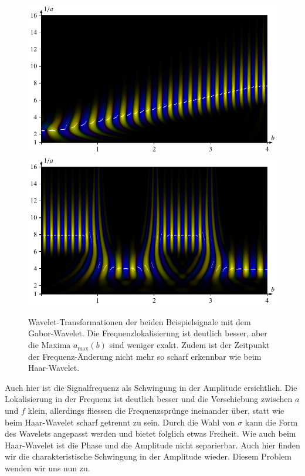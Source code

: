 \begin{figure}
	\centering
	\includegraphics{papers/complex/images/chirp_gabor.pdf}
	\includegraphics{papers/complex/images/square_gabor.pdf}
	\caption{Wavelet-Transformationen der beiden Beispielsignale mit dem Gabor-Wavelet.
		Die Frequenzlokalisierung ist deutlich besser, aber die Maxima $a_\text{max}(b)$ sind weniger exakt. Zudem ist der Zeitpunkt der Frequenz-Änderung nicht mehr so scharf erkennbar wie beim Haar-Wavelet.}
	\label{complex:gabor-ex}
\end{figure}

Auch hier ist die Signalfrequenz als Schwingung in der Amplitude ersichtlich. 
Die Lokalisierung in der Frequenz ist deutlich besser und die Verschiebung zwischen $a$ und $f$ klein, allerdings fliessen die Frequenzsprünge ineinander über, statt wie beim Haar-Wavelet scharf getrennt zu sein.
Durch die Wahl von $\sigma$ kann die Form des Wavelets angepasst werden und bietet folglich etwas Freiheit.
Wie auch beim Haar-Wavelet ist die Phase und die Amplitude nicht separierbar.
Auch hier finden wir die charakteristische Schwingung in der Amplitude wieder.
Diesem Problem wenden wir uns nun zu.
